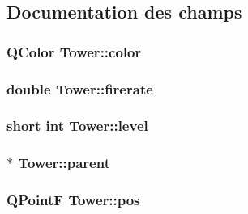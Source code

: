 \subsection{Documentation des champs}
\hypertarget{classTower_abd813990a1ae3b4300a54b38db0e1c51}{
\subsubsection[{color}]{\setlength{\rightskip}{0pt plus 5cm}QColor {\bf Tower::color}}}
\label{classTower_abd813990a1ae3b4300a54b38db0e1c51}
\hypertarget{classTower_a69f1f60ed131995bc50600bd5e53271e}{
\subsubsection[{firerate}]{\setlength{\rightskip}{0pt plus 5cm}double {\bf Tower::firerate}}}
\label{classTower_a69f1f60ed131995bc50600bd5e53271e}
\hypertarget{classTower_a4a719d8065544dd9e0285424cae755bb}{
\subsubsection[{level}]{\setlength{\rightskip}{0pt plus 5cm}short int {\bf Tower::level}}}
\label{classTower_a4a719d8065544dd9e0285424cae755bb}
\hypertarget{classTower_af840ab6d1ec47afde8beca150ee5ef60}{
\subsubsection[{parent}]{$\ast$ {\bf Tower::parent}}}
\label{classTower_af840ab6d1ec47afde8beca150ee5ef60}
\hypertarget{classTower_a2e31b99355d221706b6ec16459c4c0a1}{
\subsubsection[{pos}]{\setlength{\rightskip}{0pt plus 5cm}QPointF {\bf Tower::pos}}}
